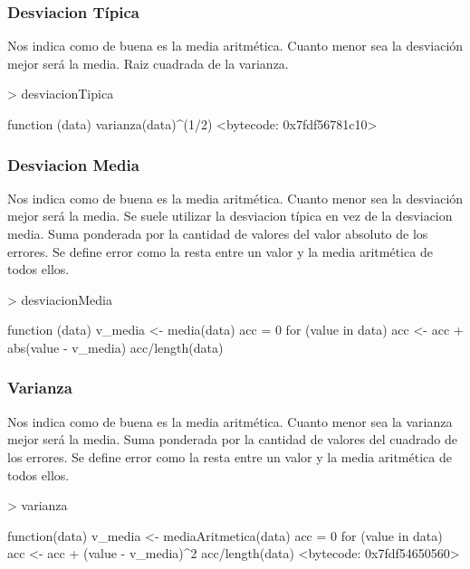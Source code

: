 \documentclass [a4paper] {article}
\begin{document}
\subsubsection{Desviacion Típica}
Nos indica como de buena es la media aritmética. Cuanto menor sea la desviación mejor será la media.
Raiz cuadrada de la varianza.
\begin{Schunk}
\begin{Sinput}
> desviacionTipica
\end{Sinput}
\begin{Soutput}
function (data) {
  varianza(data)^(1/2)
}
<bytecode: 0x7fdf56781c10>
\end{Soutput}
\end{Schunk}
\subsubsection{Desviacion Media}
Nos indica como de buena es la media aritmética. Cuanto menor sea la desviación mejor será la media.
Se suele utilizar la desviacion típica en vez de la desviacion media.
Suma ponderada por la cantidad de valores del valor absoluto de los errores.
Se define error como la resta entre un valor y la media aritmética de todos ellos.
\begin{Schunk}
\begin{Sinput}
> desviacionMedia
\end{Sinput}
\begin{Soutput}
function (data){
  v_media <- media(data)
  acc = 0
  for (value in data){
    acc <- acc + abs(value - v_media)
  }
  acc/length(data)
}
\end{Soutput}
\end{Schunk}
\subsubsection{Varianza}
Nos indica como de buena es la media aritmética. Cuanto menor sea la varianza mejor será la media.
Suma ponderada por la cantidad de valores del cuadrado de los errores.
Se define error como la resta entre un valor y la media aritmética de todos ellos.
\begin{Schunk}
\begin{Sinput}
> varianza
\end{Sinput}
\begin{Soutput}
function(data){
  v_media <- mediaAritmetica(data)
  acc = 0
  for (value in data){
    acc <- acc + (value - v_media)^2
  }
  acc/length(data)
}
<bytecode: 0x7fdf54650560>
\end{Soutput}
\end{Schunk}
\end{document}
